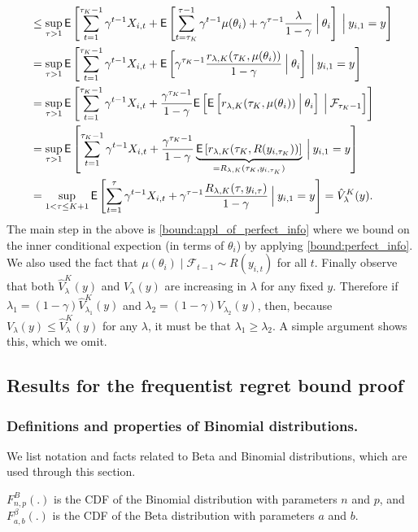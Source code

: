 \begin{myproof}[Proof.]
\begin{align}
	& \le \sup_{\tau > 1}\Ee{\sum_{t=1}^{\tau_K-1} \gamma^{t-1} X_{i,t} + \Ee{\sum_{t=\tau_K}^{\tau-1} \gamma^{t-1} \mu(\theta_i) + \gamma^{\tau-1} \frac{\lambda}{1-\gamma} \given[\Big] \theta_i}\given[\Big] y_{i,1} = y} \label{bound:appl_of_perfect_info} \\
	& = \sup_{\tau > 1}\Ee{\sum_{t=1}^{\tau_K-1} \gamma^{t-1} X_{i,t} +  \Ee{ \gamma^{\tau_K - 1} \frac{r_{\lambda,K}(\tau_K, \mu(\theta_i))}{1-\gamma} \given[\Big] \theta_i}\given[\Big] y_{i,1} = y} \nonumber \\
	& = \sup_{\tau > 1}\Ee{\sum_{t=1}^{\tau_K-1} \gamma^{t-1} X_{i,t} +  \frac{\gamma^{\tau_K - 1}}{1-\gamma}\Ee{\Ee{  r_{\lambda,K}( \tau_K, \mu(\theta_i)) \given[\Big] \theta_i} \given[\Big] \mathcal{F}_{\tau_K-1}}} \nonumber \\
	& = \sup_{\tau > 1}\Ee{\sum_{t=1}^{\tau_K-1} \gamma^{t-1} X_{i,t} +  \frac{\gamma^{\tau_K - 1}}{1-\gamma}\underbrace{\Ee{  r_{\lambda,K}( \tau_K, R(y_{i,\tau_K}))}}_{ = R_{\lambda,K}(\tau_K, y_{i,\tau_K})}\given[\Big] y_{i,1} = y} \nonumber \\
	& = \sup_{1 < \tau \le K+1}\Ee{\sum_{t=1}^{\tau} \gamma^{t-1} X_{i,t} +  \gamma^{\tau - 1} \frac{ R_{\lambda,K}(\tau, y_{i,\tau})}{1-\gamma}\given[\Big] y_{i,1} = y}  = \hat V^K_\lambda(y). \nonumber
	\end{align}
	The main step in the above is \eqref{bound:appl_of_perfect_info} where we bound on the inner conditional expection (in terms of $\theta_i$) by applying \eqref{bound:perfect_info}. We also used the fact that $\mu(\theta_i) \; | \; \mathcal F_{t-1} \sim R(y_{i,t})$ for all $t$. Finally observe that both $\hat V^K_\lambda(y)$ and $V_\lambda(y)$ are increasing in $\lambda$ for any fixed $y$. Therefore if $\lambda_1 = (1-\gamma) \hat V^K_{\lambda_1}(y)$ and $\lambda_2 = (1-\gamma) V_{\lambda_2}(y)$, then, because $V_{\lambda}(y) \le \hat V^K_{\lambda}(y)$ for any $\lambda$, it must be that  $\lambda_1 \ge \lambda_2$. A simple argument shows this, which we omit.
\end{myproof}
\subsection{Results for the frequentist regret bound proof}
\subsubsection{Definitions and properties of Binomial distributions.}
We list notation and facts related to Beta and Binomial distributions, which are used through this section.
\begin{definition}
	$F^B_{n,p}(.)$ is the CDF of the Binomial distribution with parameters $n$ and $p$, and $F^\beta_{a,b}(.)$ is the CDF of the Beta distribution with parameters $a$ and $b$.
\end{definition}

